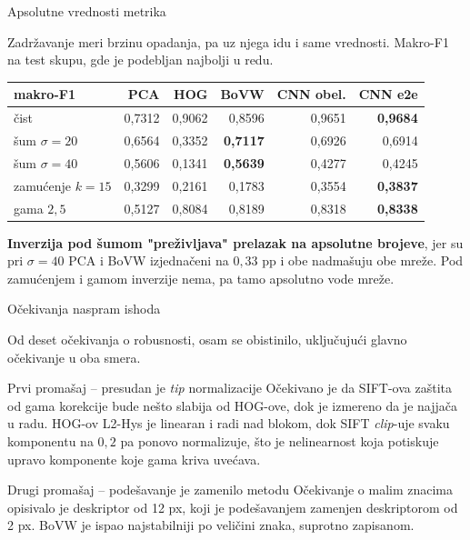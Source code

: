 \documentclass[aspectratio=169, 10pt]{beamer}
\newcommand{\uska}{\setlength{\tabcolsep}{4pt}\small}
\begin{document}
\begin{frame}{Apsolutne vrednosti metrika}

\small
Zadržavanje meri brzinu opadanja, pa uz njega idu i same vrednosti. Makro-F1 na test skupu,
gde je podebljan najbolji u redu.

\begin{center}
\uska
\begin{tabular}{lrrrrr}
\toprule
\textbf{makro-F1} & \textbf{PCA} & \textbf{HOG} & \textbf{BoVW} & \textbf{CNN obel.} & \textbf{CNN e2e} \\
\midrule
čist             & 0,7312 & 0,9062 & 0,8596 & 0,9651 & \textbf{0,9684} \\
šum $\sigma=20$  & 0,6564 & 0,3352 & \textbf{0,7117} & 0,6926 & 0,6914 \\
šum $\sigma=40$  & \alert{0,5606} & 0,1341 & \alert{\textbf{0,5639}} & 0,4277 & 0,4245 \\
zamućenje $k=15$ & 0,3299 & 0,2161 & 0,1783 & 0,3554 & \textbf{0,3837} \\
gama $2{,}5$     & 0,5127 & 0,8084 & 0,8189 & 0,8318 & \textbf{0,8338} \\
\bottomrule
\end{tabular}
\end{center}

\vspace{0.15cm}
\footnotesize
\textbf{Inverzija pod šumom "preživljava" prelazak na apsolutne brojeve}, jer su pri
$\sigma=40$ PCA i BoVW izjednačeni na $0{,}33$ pp i \alert{obe nadmašuju obe mreže}. Pod
zamućenjem i gamom inverzije nema, pa tamo apsolutno vode mreže.

\end{frame}

\begin{frame}{Očekivanja naspram ishoda}

Od deset očekivanja o robusnosti, \alert{osam se obistinilo}, uključujući glavno očekivanje u
oba smera.

\begin{block}{Prvi promašaj -- presudan je \emph{tip} normalizacije}
Očekivano je da SIFT-ova zaštita od gama korekcije bude nešto slabija od HOG-ove, dok je
izmereno da je \alert{najjača u radu}. HOG-ov L2-Hys je \alert{linearan} i radi nad blokom,
dok SIFT \textit{clip}-uje svaku komponentu na $0{,}2$ pa ponovo normalizuje, što je
\alert{nelinearnost} koja potiskuje upravo komponente koje gama kriva uvećava.
\end{block}

\begin{block}{Drugi promašaj -- podešavanje je zamenilo metodu}
Očekivanje o malim znacima opisivalo je deskriptor od 12 px, koji je podešavanjem zamenjen
deskriptorom od 2 px. BoVW je ispao \alert{najstabilniji po veličini znaka}, suprotno
zapisanom.
\end{block}

\end{frame}
\end{document}
